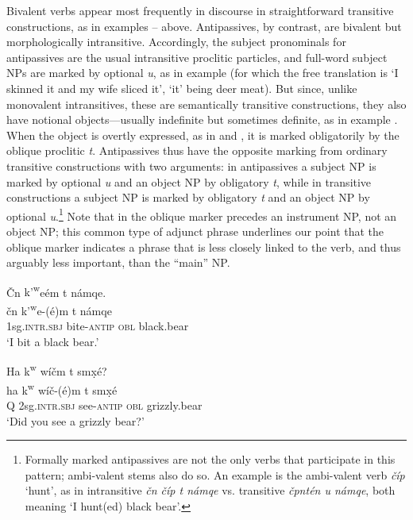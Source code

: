 \documentclass[output=paper,colorlinks,citecolor=brown]{langscibook}
\begin{document}
Bivalent verbs appear most frequently in discourse in straightforward
transitive constructions, as in examples -- above.  Antipassives, by
contrast, are bivalent but morphologically intransitive.  Accordingly,
the subject pronominals for antipassives are the usual intransitive
proclitic particles, and full-word subject NPs are marked by optional
\emph{{\textltilde}u}, as in example  (for which the free translation is
`I skinned it and my wife sliced it', `it' being deer meat).  But
since, unlike monovalent intransitives, these are semantically
transitive constructions, they also have notional objects---usually
indefinite but sometimes definite, as in example .  When the object is
overtly expressed, as in  and , it is marked obligatorily by the
oblique proclitic \emph{t}.  Antipassives thus have the opposite
marking from ordinary transitive constructions with two arguments: in
antipassives a subject NP is marked by optional \emph{{\textltilde}u}
and an object NP by obligatory \emph{t}, while in transitive
constructions a subject NP is marked by obligatory \emph{t} and an
object NP by optional \emph{{\textltilde}u}.\footnote{Formally marked
antipassives are not the only verbs that participate in this pattern;
ambi-valent stems also do so.  An example is the ambi-valent verb \emph{\v{c}{\textltilde}\'ip} `hunt', as in intransitive \emph{\v{c}n
 \v{c}{\textltilde}\'ip t n{\textltilde}\'amqe} vs. transitive \emph{\v{c}{\textltilde}pnt\'en {\textltilde}u n{\textltilde}\'amqe}, both
meaning `I hunt(ed) black bear'.} Note that in  the oblique marker
precedes an instrument NP, not an object NP; this common type of
adjunct phrase underlines our point that the oblique marker indicates
a phrase that is less closely linked to the verb, and thus arguably
less important, than the ``main'' NP.

\ea 
\label{ex-thomason-14}
\v{C}n {k'\textsuperscript w}e\textglotstop\'em t n\textltilde\'amqe. \\
\gll \v{c}n {k'\textsuperscript w}e{\textglotstop}-(\'e)m t
n\textltilde\'amqe\\
1sg.\textsc{intr.sbj} bite-\textsc{antip} \textsc{obl}  black.bear \\
\glt `I bit a  black bear.'
\z

\ea 
\label{ex-thomason-15}
Ha {k\textsuperscript w} w\'i\v{c}m t sm\d{x}\'e? \\
\gll ha k\textsuperscript w w\'i\v{c}-(\'e)m t sm\d{x}\'e\\ 
Q 2sg.\textsc{intr.sbj} see-\textsc{antip} \textsc{obl} grizzly.bear\\
\glt `Did you see a grizzly bear?'
\z 
\end{document}
